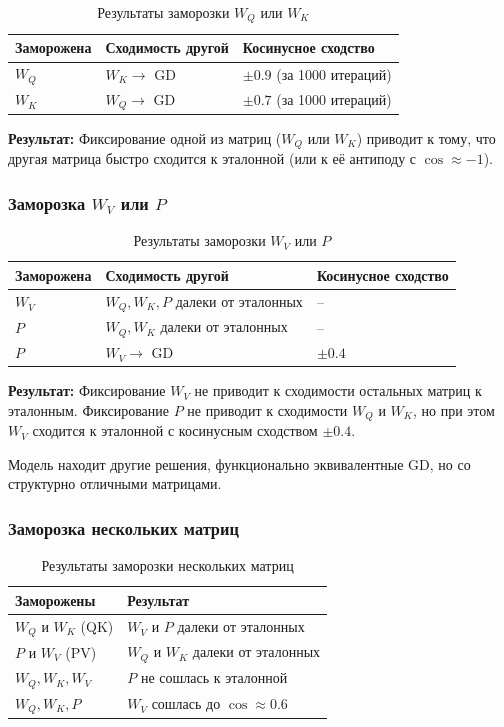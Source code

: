 \documentclass[12pt,a4paper]{article}
\begin{document}
\begin{table}[h]
\centering
\caption{Результаты заморозки \(W_Q\) или \(W_K\)}
\begin{tabular}{@{}lll@{}}
\toprule
Заморожена & Сходимость другой & Косинусное сходство \\
\midrule
\(W_Q\) & \(W_K \to\) GD & \(\pm 0.9\) (за 1000 итераций) \\
\(W_K\) & \(W_Q \to\) GD & \(\pm 0.7\) (за 1000 итераций) \\
\bottomrule
\end{tabular}
\end{table}

\textbf{Результат:} Фиксирование одной из матриц (\(W_Q\) или \(W_K\)) приводит к тому, что другая матрица быстро сходится к эталонной (или к её антиподу с \(\cos \approx -1\)).

\subsubsection{Заморозка \(W_V\) или \(P\)}

\begin{table}[h]
\centering
\caption{Результаты заморозки \(W_V\) или \(P\)}
\begin{tabular}{@{}lll@{}}
\toprule
Заморожена & Сходимость другой & Косинусное сходство \\
\midrule
\(W_V\) & \(W_Q, W_K, P\) далеки от эталонных & -- \\
\(P\) & \(W_Q, W_K\) далеки от эталонных & -- \\
\(P\) & \(W_V \to\) GD & \(\pm 0.4\) \\
\bottomrule
\end{tabular}
\end{table}

\textbf{Результат:} Фиксирование \(W_V\) не приводит к сходимости остальных матриц к эталонным. Фиксирование \(P\) не приводит к сходимости \(W_Q\) и \(W_K\), но при этом \(W_V\) сходится к эталонной с косинусным сходством \(\pm 0.4\).

Модель находит другие решения, функционально эквивалентные GD, но со структурно отличными матрицами.
\subsubsection{Заморозка нескольких матриц}

\begin{table}[h]
\centering
\caption{Результаты заморозки нескольких матриц}
\begin{tabular}{@{}ll@{}}
\toprule
Заморожены & Результат \\
\midrule
\(W_Q\) и \(W_K\) (QK) & \(W_V\) и \(P\) далеки от эталонных \\
\(P\) и \(W_V\) (PV) & \(W_Q\) и \(W_K\) далеки от эталонных \\
\(W_Q, W_K, W_V\) & \(P\) не сошлась к эталонной \\
\(W_Q, W_K, P\) & \(W_V\) сошлась до \(\cos \approx 0.6\) \\
\bottomrule
\end{tabular}
\end{table}
\end{document}
